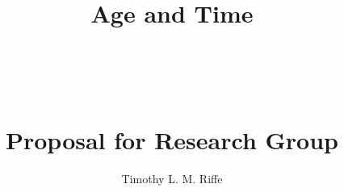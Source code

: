 \documentclass[a4paper,12pt]{article}
\begin{document}
\title{\vspace{-15mm}
\fontsize{25pt}{10pt}\selectfont
\textbf{
\hfill
\Huge{Age} \huge{and} \Huge{Time} \hfill\hfill 
} \\ ~ \\~ \\~ \\ \huge{Proposal for Research Group}}
\author{Timothy L. M. Riffe}
\maketitle

\onehalfspacing

\end{document}
